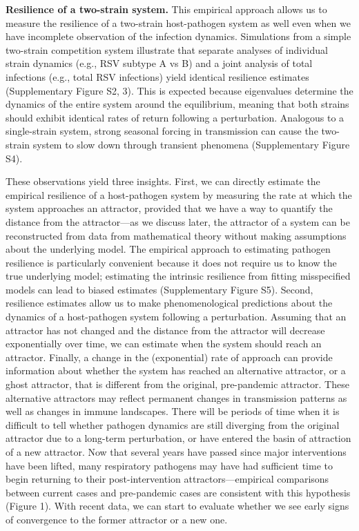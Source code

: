 \documentclass[12pt]{article}
\begin{document}
\textbf{Resilience of a two-strain system.} This empirical approach allows us to measure the resilience of a two-strain host-pathogen system as well even when we have incomplete observation of the infection dynamics.
Simulations from a simple two-strain competition system illustrate that separate analyses of individual strain dynamics (e.g., RSV subtype A vs B) and a joint analysis of total infections (e.g., total RSV infections) yield identical resilience estimates (Supplementary Figure S2, 3).
This is expected because eigenvalues determine the dynamics of the entire system around the equilibrium, meaning that both strains should exhibit identical rates of return following a perturbation.
Analogous to a single-strain system, strong seasonal forcing in transmission can cause the two-strain system to slow down through transient phenomena (Supplementary Figure S4).

These observations yield three insights.
First, we can directly estimate the empirical resilience of a host-pathogen system by measuring the rate at which the system approaches an attractor, provided that we have a way to quantify the distance from the attractor---as we discuss later, the attractor of a system can be reconstructed from data from mathematical theory without making assumptions about the underlying model.
The empirical approach to estimating pathogen resilience is particularly convenient because it does not require us to know the true underlying model;
estimating the intrinsic resilience from fitting misspecified models can lead to biased estimates (Supplementary Figure S5).
Second, resilience estimates allow us to make phenomenological predictions about the dynamics of a host-pathogen system following a perturbation.
Assuming that an attractor has not changed and the distance from the attractor will decrease exponentially over time, we can estimate when the system should reach an attractor.
Finally, a change in the (exponential) rate of approach can provide information about whether the system has reached an alternative attractor, or a ghost attractor, that is different from the original, pre-pandemic attractor.
These alternative attractors may reflect permanent changes in transmission patterns as well as changes in immune landscapes.
There will be periods of time when it is difficult to tell whether pathogen dynamics are still diverging from the original attractor due to a long-term perturbation, or have entered the basin of attraction of a new attractor. 
Now that several years have passed since major interventions have been lifted, many respiratory pathogens may have had sufficient time to begin returning to their post-intervention attractors---empirical comparisons between current cases and pre-pandemic cases are consistent with this hypothesis (Figure 1).
With recent data, we can start to evaluate whether we see early signs of convergence to the former attractor or a new one.
\end{document}
